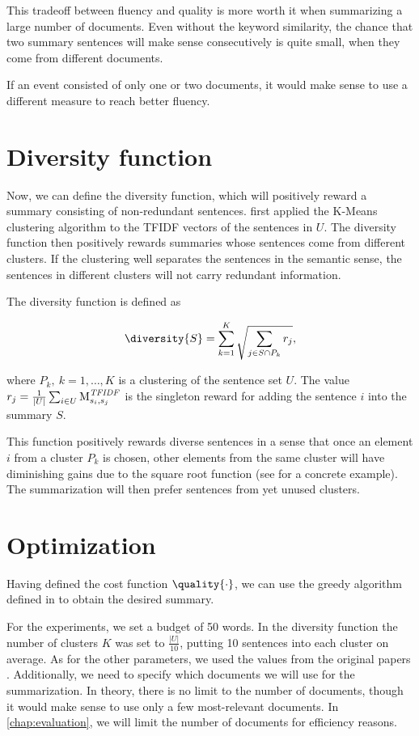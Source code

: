 This tradeoff between fluency and quality is more worth it when summarizing a large number of documents. Even without the keyword similarity, the chance that two summary sentences will make sense consecutively is quite small, when they come from different documents.

If an event consisted of only one or two documents, it would make sense to use a different measure to reach better fluency.

\section{Diversity function}
Now, we can define the diversity function, which will positively reward a summary consisting of non-redundant sentences. \cite{multi-summarization-2} first applied the K-Means clustering algorithm to the TFIDF vectors of the sentences in $U$. The diversity function then positively rewards summaries whose sentences come from different clusters. If the clustering well separates the sentences in the semantic sense, the sentences in different clusters will not carry redundant information.

The diversity function is defined as

\begin{equation} \label{eq:diversity}
	\diversity{S} = \sum_{k = 1}^{K} \sqrt{\sum_{j \in S \cap P_{k}} r_{j}},
\end{equation}

where $P_{k},\ k = 1, \dots, K$ is a clustering of the sentence set $U$. The value $r_{j} = \frac{1}{\left| U \right|} \sum_{i \in U} \text{M}_{s_{i}, s_{j}}^{\mathit{TFIDF}}$ is the singleton reward for adding the sentence $i$ into the summary $S$.

This function positively rewards diverse sentences in a sense that once an element $i$ from a cluster $P_{k}$ is chosen, other elements from the same cluster will have diminishing gains due to the square root function (see \cite{multi-summarization-2} for a concrete example). The summarization will then prefer sentences from yet unused clusters.


\section{Optimization}
Having defined the cost function $\quality{\cdot}$, we can use the greedy algorithm defined in \cite{multi-summarization-1} to obtain the desired summary.

For the experiments, we set a budget of 50 words. In the diversity function the number of clusters $K$ was set to $\frac{\left| U \right|}{10}$, putting 10 sentences into each cluster on average. As for the other parameters, we used the values from the original papers \citep{multi-summarization-1, multi-summarization-2}. Additionally, we need to specify which documents we will use for the summarization. In theory, there is no limit to the number of documents, though it would make sense to use only a few most-relevant documents. In \autoref{chap:evaluation}, we will limit the number of documents for efficiency reasons.

